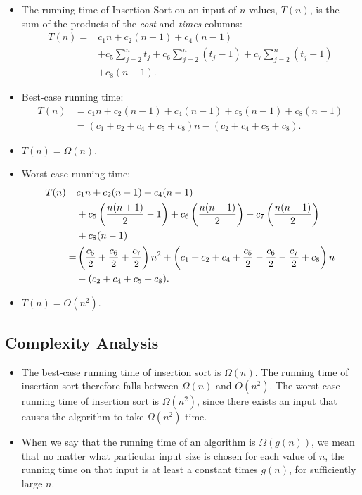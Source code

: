 \documentclass[12pt,openany]{book}
\theoremstyle{definition}
\begin{document}
	\begin{itemize}
		\item The running time of Insertion-Sort on an input of $n$ values, $T(n)$, is the sum of the products of the \textit{cost} and \textit{times} columns:
		\begin{align*}
			T(n)=&c_1n+c_2(n-1)+c_4(n-1)\\
			&+c_5\sum_{j=2}^{n}t_j+c_6\sum_{j=2}^{n}(t_j-1)+c_7\sum_{j=2}^{n}(t_j-1)\\
			&+c_8(n-1).
		\end{align*}
		\item Best-case running time: \begin{align*}
			T(n)&=c_1n+c_2(n-1)+c_4(n-1)+c_5(n-1)+c_8(n-1)\\
			&=(c_1+c_2+c_4+c_5+c_8)n-(c_2+c_4+c_5+c_8).
		\end{align*}
		\item $T(n)=\Omega(n)$.
		\item Worst-case running time:
		\begin{align*}
			T(n)=&c_1n+c_2(n-1)+c_4(n-1)\\
			&+c_5\del{\frac{n(n+1)}{2}-1}+c_6\del{\frac{n(n-1)}{2}}+c_7\del{\frac{n(n-1)}{2}}\\
			&+c_8(n-1)\\
			=&\del{\frac{c_5}{2}+\frac{c_6}{2}+\frac{c_7}{2}}n^2+\del{c_1+c_2+c_4+\frac{c_5}{2}-\frac{c_6}{2}-\frac{c_7}{2}+c_8}n\\
			&-(c_2+c_4+c_5+c_8).
		\end{align*}
		\item $T(n)=O(n^2)$.
	\end{itemize}
	
	\subsection{Complexity Analysis}
	\begin{itemize}
		\item The best-case running time of insertion
		sort is $\Omega(n)$. The running time of insertion
		sort therefore falls between $\Omega(n)$ and
		$O(n^2)$. The worst-case running time of
		insertion sort is $\Omega(n^2)$, since there exists
		an input that causes the algorithm to
		take $\Omega(n^2)$ time.
		\item When we say that the running time of an
		algorithm is $\Omega(g(n))$, we mean that no
		matter what particular input size is chosen
		for each value of $n$, the running time on
		that input is at least a constant times $g(n)$,
		for sufficiently large $n$.
	\end{itemize}
\end{document}
